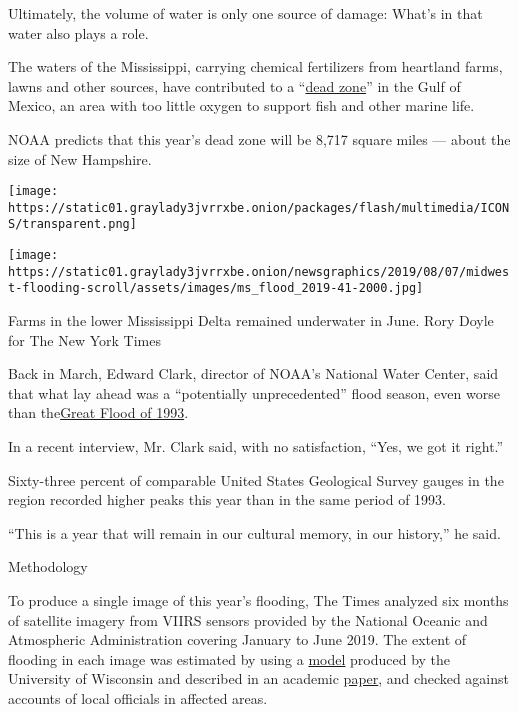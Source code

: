 Ultimately, the volume of water is only one source of damage: What's in
that water also plays a role.

The waters of the Mississippi, carrying chemical fertilizers from
heartland farms, lawns and other sources, have contributed to a
``\href{https://www.noaa.gov/media-release/noaa-forecasts-very-large-dead-zone-for-gulf-of-mexico}{dead
zone}'' in the Gulf of Mexico, an area with too little oxygen to support
fish and other marine life.

NOAA predicts that this year's dead zone will be 8,717 square miles ---
about the size of New Hampshire.

\texttt{[image: https://static01.graylady3jvrrxbe.onion/packages/flash/multimedia/ICONS/transparent.png]}

\texttt{[image: https://static01.graylady3jvrrxbe.onion/newsgraphics/2019/08/07/midwest-flooding-scroll/assets/images/ms\_flood\_2019-41-2000.jpg]}

Farms in the lower Mississippi Delta remained underwater in June. Rory
Doyle for The New York Times

Back in March, Edward Clark, director of NOAA's National Water Center,
said that what lay ahead was a ``potentially unprecedented'' flood
season, even worse than
the\href{https://www.nytimes3xbfgragh.onion/2019/06/03/us/midwest-floods.html}{}\href{https://www.nytimes3xbfgragh.onion/2019/06/03/us/midwest-floods.html}{Great
Flood of 1993}.

In a recent interview, Mr. Clark said, with no satisfaction, ``Yes, we
got it right.''

Sixty-three percent of comparable United States Geological Survey gauges
in the region recorded higher peaks this year than in the same period of
1993.

``This is a year that will remain in our cultural memory, in our
history,'' he said.

Methodology

To produce a single image of this year's flooding, The Times analyzed
six months of satellite imagery from VIIRS sensors provided by the
National Oceanic and Atmospheric Administration covering January to June
2019. The extent of flooding in each image was estimated by using a
\href{https://cimss.ssec.wisc.edu/cspp/}{model} produced by the
University of Wisconsin and described in an academic
\href{https://www.sciencedirect.com/science/article/abs/pii/S0034425717304431}{paper},
and checked against accounts of local officials in affected areas.

